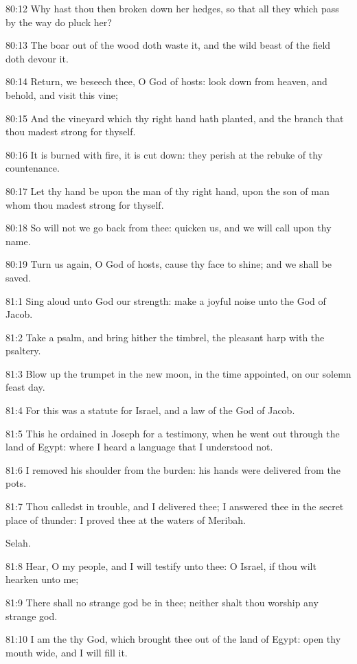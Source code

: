 80:12 Why hast thou then broken down her hedges, so that all they
which pass by the way do pluck her?

80:13 The boar out of the wood doth waste it, and the wild beast of
the field doth devour it.

80:14 Return, we beseech thee, O God of hosts: look down from heaven,
and behold, and visit this vine;

80:15 And the vineyard which thy right hand hath planted, and the
branch that thou madest strong for thyself.

80:16 It is burned with fire, it is cut down: they perish at the
rebuke of thy countenance.

80:17 Let thy hand be upon the man of thy right hand, upon the son of
man whom thou madest strong for thyself.

80:18 So will not we go back from thee: quicken us, and we will call
upon thy name.

80:19 Turn us again, O \LORD God of hosts, cause thy face to shine; and
we shall be saved.



81:1 Sing aloud unto God our strength: make a joyful noise unto the
God of Jacob.

81:2 Take a psalm, and bring hither the timbrel, the pleasant harp
with the psaltery.

81:3 Blow up the trumpet in the new moon, in the time appointed, on
our solemn feast day.

81:4 For this was a statute for Israel, and a law of the God of Jacob.

81:5 This he ordained in Joseph for a testimony, when he went out
through the land of Egypt: where I heard a language that I understood
not.

81:6 I removed his shoulder from the burden: his hands were delivered
from the pots.

81:7 Thou calledst in trouble, and I delivered thee; I answered thee
in the secret place of thunder: I proved thee at the waters of
Meribah.

Selah.

81:8 Hear, O my people, and I will testify unto thee: O Israel, if
thou wilt hearken unto me;

81:9 There shall no strange god be in thee; neither shalt thou worship
any strange god.

81:10 I am the \LORD thy God, which brought thee out of the land of
Egypt: open thy mouth wide, and I will fill it.

